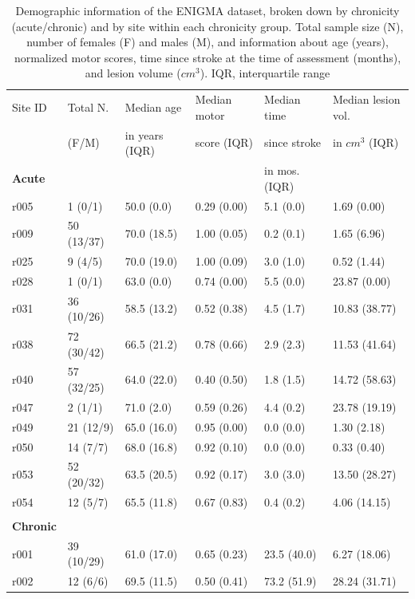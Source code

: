 \documentclass[10pt]{article}
\begin{document}
\newpage
\begin{table}[h]
\centering
\caption{Demographic information of the ENIGMA dataset, broken down by chronicity (acute/chronic) and by site within each chronicity group. Total sample size (N), number of females (F) and males (M), and information about age (years), normalized motor scores, time since stroke at the time of assessment (months), and lesion volume ($cm^3$). IQR, interquartile range}

\label{table:Demographics}
\begin{tabular}{llllll}
\toprule
Site ID & Total N. & Median age & Median motor  & Median time    & Median lesion vol. \\
& (F/M) & in years (IQR) & score (IQR) &  since stroke  & in $cm^3$ (IQR) \\
 \textbf{Acute}  & & & & in mos. (IQR) & \\
\arrayrulecolor{black!30}\midrule
r005 & 1 (0/1) & 50.0 (0.0) & 0.29 (0.00) & 5.1 (0.0) & 1.69 (0.00) \\
r009 & 50 (13/37) & 70.0 (18.5) & 1.00 (0.05) & 0.2 (0.1) & 1.65 (6.96) \\
r025 & 9 (4/5) & 70.0 (19.0) & 1.00 (0.09) & 3.0 (1.0) & 0.52 (1.44) \\
r028 & 1 (0/1) & 63.0 (0.0) & 0.74 (0.00) & 5.5 (0.0) & 23.87 (0.00) \\
r031 & 36 (10/26) & 58.5 (13.2) & 0.52 (0.38) & 4.5 (1.7) & 10.83 (38.77) \\
r038 & 72 (30/42) & 66.5 (21.2) & 0.78 (0.66) & 2.9 (2.3) & 11.53 (41.64) \\
r040 & 57 (32/25) & 64.0 (22.0) & 0.40 (0.50) & 1.8 (1.5) & 14.72 (58.63) \\
r047 & 2 (1/1) & 71.0 (2.0) & 0.59 (0.26) & 4.4 (0.2) & 23.78 (19.19) \\
r049 & 21 (12/9) & 65.0 (16.0) & 0.95 (0.00) & 0.0 (0.0) & 1.30 (2.18) \\
r050 & 14 (7/7) & 68.0 (16.8) & 0.92 (0.10) & 0.0 (0.0) & 0.33 (0.40) \\
r053 & 52 (20/32) & 63.5 (20.5) & 0.92 (0.17) & 3.0 (3.0) & 13.50 (28.27) \\
r054 & 12 (5/7) & 65.5 (11.8) & 0.67 (0.83) & 0.4 (0.2) & 4.06 (14.15) \\
 & & & & &\\
\textbf{Chronic}  & & & & &\\
\arrayrulecolor{black!30}\midrule
r001 & 39 (10/29) & 61.0 (17.0) & 0.65 (0.23) & 23.5 (40.0) & 6.27 (18.06) \\
r002 & 12 (6/6) & 69.5 (11.5) & 0.50 (0.41) & 73.2 (51.9) & 28.24 (31.71) \\

\end{tabular}
\end{table}
\end{document}

